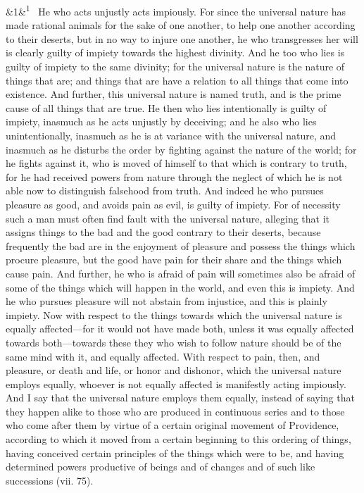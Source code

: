 \documentclass[12pt]{article}
\newcommand{\para}[1][]{\par\noindent\ifx&#1&\else\textsuperscript{\footnotesize #1}~\fi}
\begin{document}
\para[1] He who acts unjustly acts impiously. For since the universal nature has
made rational animals for the sake of one another, to help one another
according to their deserts, but in no way to injure one another, he who
transgresses her will is clearly guilty of impiety towards the highest
divinity. And he too who lies is guilty of impiety to the same divinity;
for the universal nature is the nature of things that are; and things
that are have a relation to all things that come into existence. And
further, this universal nature is named truth, and is the prime cause of
all things that are true. He then who lies intentionally is guilty of
impiety, inasmuch as he acts unjustly by deceiving; and he also who lies
unintentionally, inasmuch as he is at variance with the universal
nature, and inasmuch as he disturbs the order by fighting against the
nature of the world; for he fights against it, who is moved of himself
to that which is contrary to truth, for he had received powers from
nature through the neglect of which he is not able now to distinguish
falsehood from truth. And indeed he who pursues pleasure as good, and
avoids pain as evil, is guilty of impiety. For of necessity such a man
must often find fault with the universal nature, alleging that it
assigns things to the bad and the good contrary to their deserts,
because frequently the bad are in the enjoyment of pleasure and possess
the things which procure pleasure, but the good have pain for their
share and the things which cause pain. And further, he who is afraid of
pain will sometimes also be afraid of some of the things which will
happen in the world, and even this is impiety. And he who pursues
pleasure will not abstain from injustice, and this is plainly impiety.
Now with respect to the things towards which the universal nature is
equally affected---for it would not have made both, unless it was equally
affected towards both---towards these they who wish to follow nature
should be of the same mind with it, and equally affected. With respect
to pain, then, and pleasure, or death and life, or honor and dishonor,
which the universal nature employs equally, whoever is not equally
affected is manifestly acting impiously. And I say that the universal
nature employs them equally, instead of saying that they happen alike to
those who are produced in continuous series and to those who come after
them by virtue of a certain original movement of Providence, according
to which it moved from a certain beginning to this ordering of things,
having conceived certain principles of the things which were to be, and
having determined powers productive of beings and of changes and of such
like successions (vii. 75).
\end{document}

